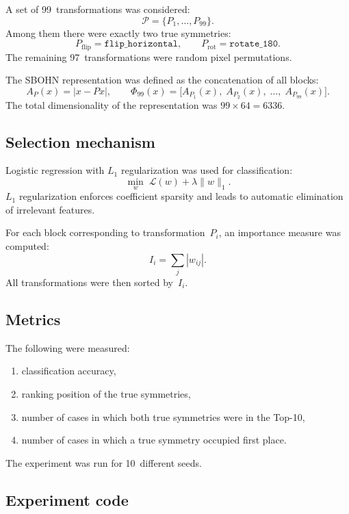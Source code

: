 \documentclass[11pt,a4paper]{report}
\begin{document}
A set of 99~transformations was considered:
\[
\mathcal{P}=\{P_1,\ldots,P_{99}\}.
\]
Among them there were exactly two true symmetries:
\[
P_{\mathrm{flip}}=\texttt{flip\_horizontal},
\qquad
P_{\mathrm{rot}}=\texttt{rotate\_180}.
\]
The remaining 97~transformations were random pixel permutations.

The SBOHN representation was defined as the concatenation of all blocks:
\[
A_{P}(x)=|x-Px|,
\qquad
\Phi_{99}(x)=\bigl[A_{P_1}(x),\;A_{P_2}(x),\;\dots,\;A_{P_{99}}(x)\bigr].
\]
The total dimensionality of the representation was $99\times 64=6336$.

\subsection{Selection mechanism}

Logistic regression with $L_1$ regularization was used for classification:
\[
\min_w\;\mathcal{L}(w)+\lambda\|w\|_1.
\]
$L_1$ regularization enforces coefficient sparsity and leads to automatic elimination of irrelevant features.

For each block corresponding to transformation~$P_i$, an importance measure was computed:
\[
I_i=\sum_j |w_{ij}|.
\]
All transformations were then sorted by~$I_i$.

\subsection{Metrics}

The following were measured:
\begin{enumerate}
\item classification accuracy,
\item ranking position of the true symmetries,
\item number of cases in which both true symmetries were in the Top-10,
\item number of cases in which a true symmetry occupied first place.
\end{enumerate}

The experiment was run for 10~different seeds.

\subsection{Experiment code}

\noindent{}
\end{document}
